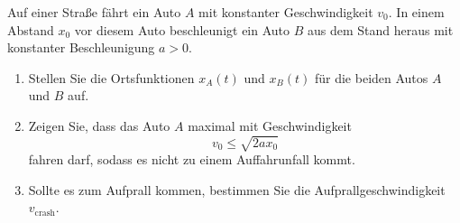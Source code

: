\begin{ExerciseBlock}
Auf einer Straße fährt ein Auto $A$ mit konstanter Geschwindigkeit $v_0$. In einem Abstand $x_0$ vor diesem Auto beschleunigt ein Auto $B$ aus dem Stand heraus mit konstanter Beschleunigung $a > 0$.

\begin{enumerate}
	\item Stellen Sie die Ortsfunktionen $x_A(t)$ und $x_B(t)$ für die beiden Autos $A$ und $B$ auf.

	\item Zeigen Sie, dass das Auto $A$ maximal mit Geschwindigkeit \[ v_0 \leq \sqrt{2 a x_0} \] fahren darf, sodass es nicht zu einem Auffahrunfall kommt.

	\item Sollte es zum Aufprall kommen, bestimmen Sie die Aufprallgeschwindigkeit $v_\text{crash}$.

\end{enumerate}
\end{ExerciseBlock}
